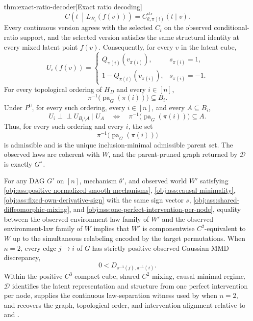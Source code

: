 \begin{theoremv}{thm:exact-ratio-decoder}[Exact ratio decoding]
\[
C\!\left(t\,\middle|\,L_{B_i}(f(v))\right)
=
C_{\theta,\pi(i)}^{\mathrm{str}}(t\mid v).
\]
Every continuous version agrees with the selected \(C_i\) on the observed conditional-ratio support, and the selected version satisfies the same structural identity at every mixed latent point \(f(v)\). Consequently, for every \(v\) in the latent cube,
\[
U_i(f(v))=
\begin{cases}
Q_{\pi(i)}(v_{\pi(i)}), & s_{\pi(i)}=1,\\
1-Q_{\pi(i)}(v_{\pi(i)}), & s_{\pi(i)}=-1.
\end{cases}
\]
For every topological ordering of \(H_D\) and every \(i\in[n]\),
\[
\pi^{-1}\!\bigl(\operatorname{pa}_G(\pi(i))\bigr)\subseteq B_i.
\]
Under \(P^0\), for every such ordering, every \(i\in[n]\), and every \(A\subseteq B_i\),
\[
U_i\perp\!\!\!\perp U_{B_i\setminus A}\mid U_A
\quad\Longleftrightarrow\quad
\pi^{-1}\!\bigl(\operatorname{pa}_G(\pi(i))\bigr)\subseteq A.
\]
Thus, for every such ordering and every \(i\), the set
\[
\pi^{-1}\!\bigl(\operatorname{pa}_G(\pi(i))\bigr)
\]
is admissible and is the unique inclusion-minimal admissible parent set. The observed laws are coherent with \(W\), and the parent-pruned graph returned by \(\mathscr D\) is exactly \(G^\pi\).

For any DAG \(G'\) on \([n]\), mechanism \(\theta'\), and observed world \(W'\) satisfying \cref{obj:ass:positive-normalized-smooth-mechanisms}, \cref{obj:ass:causal-minimality}, \cref{obj:ass:fixed-own-derivative-sign} with the same sign vector \(s\), \cref{obj:ass:shared-diffeomorphic-mixing}, and \cref{obj:ass:one-perfect-intervention-per-node}, equality between the observed environment-law family of \(W'\) and the observed environment-law family of \(W\) implies that \(W'\) is componentwise \(C^2\)-equivalent to \(W\) up to the simultaneous relabeling encoded by the target permutations. When \(n=2\), every edge \(j\to i\) of \(G\) has strictly positive observed Gaussian-MMD discrepancy,
\[
0<D_{\pi^{-1}(j),\pi^{-1}(i)}.
\]
Within the positive \(C^3\) compact-cube, shared \(C^2\)-mixing, causal-minimal regime, \(\mathscr D\) identifies the latent representation and structure from one perfect intervention per node, supplies the continuous law-separation witness used by \citet[Theorem~3.2]{vonKugelgenEtAl2023UnknownInterventions} when \(n=2\), and recovers the graph, topological order, and intervention alignment relative to \citet[Theorem~4.2]{WendongEtAl2023CauCA} and \citet[Corollary~{D}.1]{YaoEtAl2025InvariancePrinciple}.
\end{theoremv}

